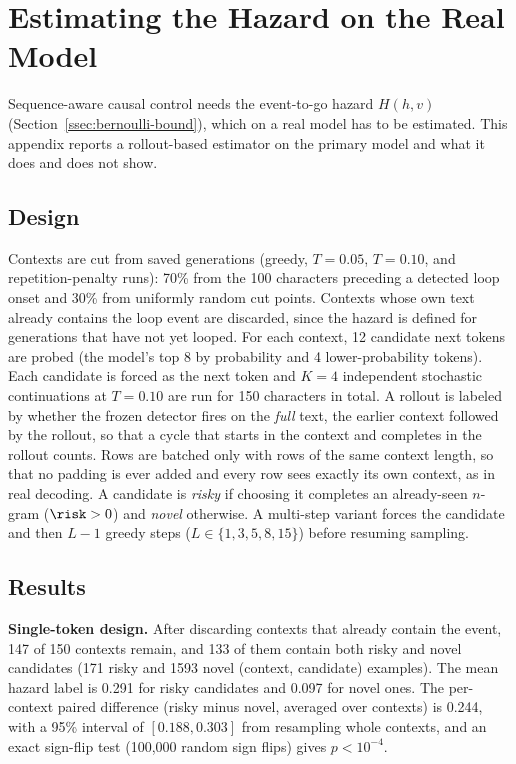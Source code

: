 \section{Estimating the Hazard on the Real Model}
\label{sec:hazard-transfer}

Sequence-aware causal control needs the event-to-go hazard $H(h,v)$ (Section~\ref{ssec:bernoulli-bound}), which on a real model has to be estimated. This appendix reports a rollout-based estimator on the primary model and what it does and does not show.

\subsection{Design}
Contexts are cut from saved generations (greedy, $T{=}0.05$, $T{=}0.10$, and repetition-penalty runs): 70\% from the 100 characters preceding a detected loop onset and 30\% from uniformly random cut points. Contexts whose own text already contains the loop event are discarded, since the hazard is defined for generations that have not yet looped. For each context, 12 candidate next tokens are probed (the model's top 8 by probability and 4 lower-probability tokens). Each candidate is forced as the next token and $K{=}4$ independent stochastic continuations at $T{=}0.10$ are run for 150 characters in total. A rollout is labeled by whether the frozen detector fires on the \emph{full} text, the earlier context followed by the rollout, so that a cycle that starts in the context and completes in the rollout counts. Rows are batched only with rows of the same context length, so that no padding is ever added and every row sees exactly its own context, as in real decoding. A candidate is \emph{risky} if choosing it completes an already-seen $n$-gram ($\risk>0$) and \emph{novel} otherwise. A multi-step variant forces the candidate and then $L{-}1$ greedy steps ($L\in\{1,3,5,8,15\}$) before resuming sampling.

\subsection{Results}
\textbf{Single-token design.} After discarding contexts that already contain the event, 147 of 150 contexts remain, and 133 of them contain both risky and novel candidates (171 risky and 1593 novel (context, candidate) examples). The mean hazard label is 0.291 for risky candidates and 0.097 for novel ones. The per-context paired difference (risky minus novel, averaged over contexts) is 0.244, with a 95\% interval of $[0.188,0.303]$ from resampling whole contexts, and an exact sign-flip test (100{,}000 random sign flips) gives $p<10^{-4}$.

